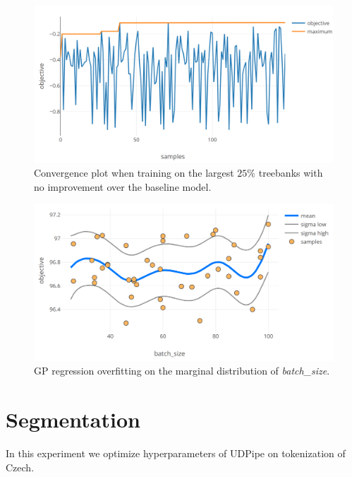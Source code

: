 \begin{figure}
	\begin{center}
		\includegraphics[width=1\textwidth]{images/sig-large-convergence.png}
		\caption{Convergence plot when training on the largest $25\%$ treebanks with no improvement over the baseline model.}
		\label{figure:sig-large-convergence}
	\end{center}
\end{figure}


\begin{figure}
	\begin{center}
		\includegraphics[width=1\textwidth]{images/tokenizer-overfitting-batch-size.png}
		\caption{GP regression overfitting on the marginal distribution of \emph{batch\_size}.}
		\label{figure:gp-overfitting-batch-size}
	\end{center}
\end{figure}

\clearpage
\section{Segmentation}

In this experiment we optimize hyperparameters of UDPipe \citep{udpipe:2017} on tokenization of Czech.

